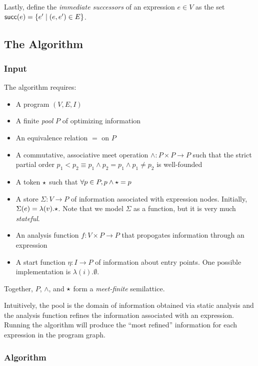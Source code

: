 \documentclass{article}
\begin{document}
Lastly, define the \emph{immediate successors} of an expression $e \in V$ as the set $\mathsf{succ}(e) = \{ e' \mid (e, e') \in E\}$.


\subsection*{The Algorithm}
\subsubsection*{Input}
\label{input}

The algorithm requires:
\begin{itemize}
\item A program $(V, E, I)$
\item A finite \emph{pool} $P$ of optimizing information
\item An equivalence relation $=$ on $P$
\item A commutative, associative meet operation $\wedge : P \times P \rightarrow P$
      such that the strict partial order $p_1 < p_2 \equiv p_1 \wedge p_2 = p_1 \wedge p_1 \neq p_2$ is well-founded
\item A token $\star$ such that $\forall p \in P, p \wedge \star = p$
\item A store $\Sigma : V \rightarrow P$ of information associated with expression nodes.
      Initially, $\Sigma(e) = \lambda(v). \star$.
      Note that we model $\Sigma$ as a function, but it is very much \emph{stateful}.
\item An analysis function $f : V \times P \rightarrow P$ that propogates information through an expression
\item A start function $\eta : I \rightarrow P$ of information about entry points.
      One possible implementation is $\lambda(i). \emptyset$.
\end{itemize}
Together, $P$, $\wedge$, and $\star$ form a \emph{meet-finite} semilattice.

Intuitively, the pool is the domain of information obtained via static analysis and the analysis function refines the information associated with an expression.
Running the algorithm will produce the ``most refined'' information for each expression in the program graph.


\subsubsection*{Algorithm}
\label{algorithm}
\end{document}
